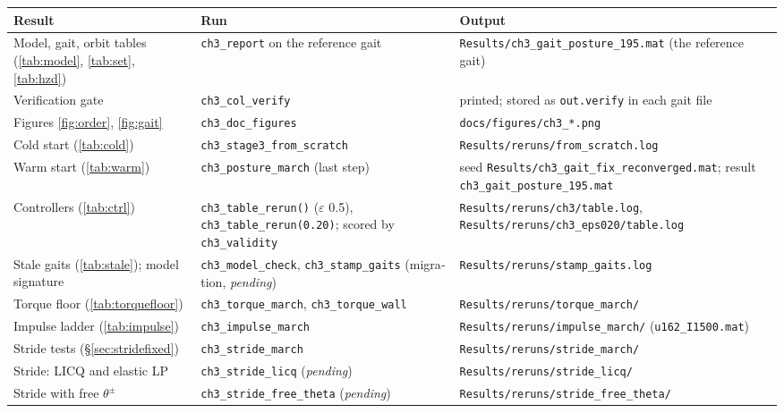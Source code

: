\documentclass[10pt,twocolumn]{article}
\begin{document}
\begin{latin}
\footnotesize
\setlength{\tabcolsep}{4pt}
\begin{tabular}{p{}p{}p{}}
    \toprule
    Result & Run & Output \\
    \midrule
    Model, gait, orbit tables (\ref{tab:model}, \ref{tab:set}, \ref{tab:hzd}) &
        \texttt{ch3\_report} on the reference gait &
        \texttt{Results/ch3\_gait\_posture\_195.mat} (the reference gait) \\
    Verification gate &
        \texttt{ch3\_col\_verify} & printed; stored as \texttt{out.verify} in each gait file \\
    Figures \ref{fig:order}, \ref{fig:gait} &
        \texttt{ch3\_doc\_figures} & \texttt{docs/figures/ch3\_*.png} \\
    Cold start (\ref{tab:cold}) &
        \texttt{ch3\_stage3\_from\_scratch} & \texttt{Results/reruns/from\_scratch.log} \\
    Warm start (\ref{tab:warm}) &
        \texttt{ch3\_posture\_march} (last step) &
        seed \texttt{Results/ch3\_gait\_fix\_reconverged.mat}; result \texttt{ch3\_gait\_posture\_195.mat} \\
    Controllers (\ref{tab:ctrl}) &
        \texttt{ch3\_table\_rerun()} ($\varepsilon$ 0.5), \texttt{ch3\_table\_rerun(0.20)}; scored by \texttt{ch3\_validity} &
        \texttt{Results/reruns/ch3/table.log}, \texttt{Results/reruns/ch3\_eps020/table.log} \\
    Stale gaits (\ref{tab:stale}); model signature &
        \texttt{ch3\_model\_check}, \texttt{ch3\_stamp\_gaits} (migration, \emph{pending}) &
        \texttt{Results/reruns/stamp\_gaits.log} \\
    Torque floor (\ref{tab:torquefloor}) &
        \texttt{ch3\_torque\_march}, \texttt{ch3\_torque\_wall} & \texttt{Results/reruns/torque\_march/} \\
    Impulse ladder (\ref{tab:impulse}) &
        \texttt{ch3\_impulse\_march} & \texttt{Results/reruns/impulse\_march/} (\texttt{u162\_I1500.mat}) \\
    Stride tests (\S\ref{sec:stridefixed}) &
        \texttt{ch3\_stride\_march} & \texttt{Results/reruns/stride\_march/} \\
    Stride: LICQ and elastic LP &
        \texttt{ch3\_stride\_licq} (\emph{pending}) & \texttt{Results/reruns/stride\_licq/} \\
    Stride with free $\theta^\pm$ &
        \texttt{ch3\_stride\_free\_theta} (\emph{pending}) & \texttt{Results/reruns/stride\_free\_theta/} \\

\end{tabular}
\end{latin}
\end{document}
